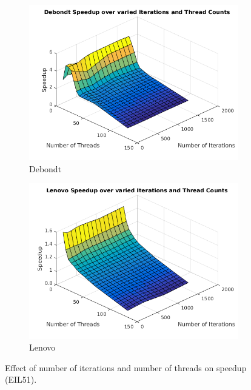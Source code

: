 \documentclass[10pt,letterpaper]{article}
\begin{document}
\begin{figure}[t]
\centering
  \begin{subfigure}{0.49\linewidth} \centering
	\includegraphics[width=\textwidth]{../img/Debondt_IterationvsThreads.png}
    \caption{Debondt}\label{fig:figA}
  \end{subfigure}
  \begin{subfigure}{0.49\linewidth} \centering
	\includegraphics[width=\textwidth]{../img/Lenovo_IterationvsThreads.png}
    \caption{Lenovo}\label{fig:figB}
  \end{subfigure}
\caption{Effect of number of iterations and number of threads on speedup (EIL51).} \label{fig:itervsthreads}
\end{figure}
\end{document}
